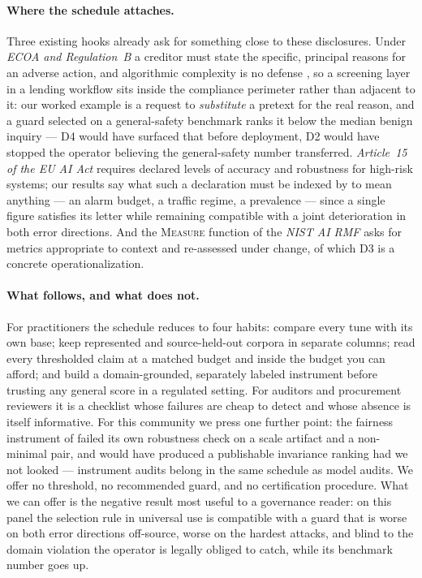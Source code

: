 \documentclass[manuscript,screen,review,anonymous]{acmart}
\begin{document}
\paragraph{Where the schedule attaches.} Three existing hooks already ask for something close to these
disclosures. Under \emph{ECOA and Regulation~B} a creditor must state the specific, principal reasons for
an adverse action, and algorithmic complexity is no defense \citep{regb,cfpb2022circular}, so a screening
layer in a lending workflow sits inside the compliance perimeter rather than adjacent to it: our worked
example is a request to \emph{substitute} a pretext for the real reason, and a guard selected on a
general-safety benchmark ranks it below the median benign inquiry --- D4 would have surfaced that before
deployment, D2 would have stopped the operator believing the general-safety number transferred.
\emph{Article~15 of the EU AI Act} \citep{euaiact2024} requires declared levels of accuracy and
robustness for high-risk systems; our results say what such a declaration must be indexed by to mean
anything --- an alarm budget, a traffic regime, a prevalence --- since a single figure satisfies its
letter while remaining compatible with a joint deterioration in both error directions. And the
\textsc{Measure} function of the \emph{NIST AI RMF} \citep{nist2023airmf} asks for metrics appropriate to
context and re-assessed under change, of which D3 is a concrete operationalization.

\paragraph{What follows, and what does not.} For practitioners the schedule reduces to four habits:
compare every tune with its own base; keep represented and source-held-out corpora in separate columns;
read every thresholded claim at a matched budget and inside the budget you can afford; and build a
domain-grounded, separately labeled instrument before trusting any general score in a regulated setting.
For auditors and procurement reviewers it is a checklist whose failures are cheap to detect and whose
absence is itself informative. For this community we press one further point: the fairness instrument of
 failed its own robustness check on a scale artifact and a non-minimal
pair, and would have produced a publishable invariance ranking had we not looked --- instrument audits
belong in the same schedule as model audits. We offer no threshold, no recommended guard, and no
certification procedure. What we can offer is the negative result most useful to a governance reader:
on this panel the selection rule in universal use is compatible with a guard that is worse on both error
directions off-source, worse on the hardest attacks, and blind to the domain violation the operator is
legally obliged to catch, while its benchmark number goes up.
\end{document}
